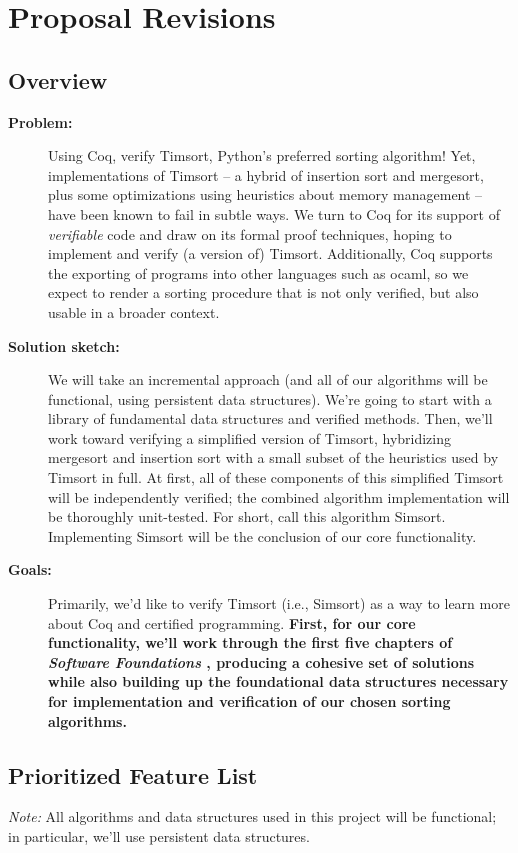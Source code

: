 \documentclass{article}
\begin{document}
\section{Proposal Revisions}
\subsection{Overview}
\begin{description}
  \item[\textbf{Problem:}]
    Using Coq, verify Timsort, Python's preferred sorting algorithm!
Yet, implementations of Timsort --
a hybrid of insertion sort and
mergesort, plus some optimizations using heuristics about memory management --
have been known
to fail in subtle ways.
We turn to Coq for its support of \emph{verifiable} code and draw on
its formal proof techniques, hoping to implement and verify (a version of)
Timsort.
Additionally, Coq supports the
exporting of programs into other languages such as ocaml, so we expect to
render a sorting procedure that is not only verified, but also
usable in a broader context.

  \item[\textbf{Solution sketch:}]
    We will take an incremental approach (and all of our algorithms
    will be functional, using persistent data structures).
    We're going to start with a
    library of fundamental data structures and verified methods.
    Then, we'll work toward verifying a
    simplified version of Timsort,
    hybridizing mergesort and insertion sort
    with a small subset of the heuristics used by Timsort in full.
    At first, all of these components of this simplified Timsort will
    be independently verified; the combined algorithm implementation
    will be thoroughly unit-tested.
    For short, call this algorithm Simsort.
    Implementing Simsort will be the conclusion of our core functionality.

  \item[\textbf{Goals:}]
    Primarily, we'd like to verify Timsort (i.e., Simsort) as a way to
    learn more about Coq and certified programming.
    \textbf{First, for our core functionality, we'll work through the first five
    chapters of \emph{Software Foundations} \cite{sf},
    producing a cohesive set of
    solutions while also building up the foundational data structures
    necessary for implementation and verification of our chosen
    sorting algorithms.}
\end{description}


\subsection{Prioritized Feature List}
\emph{Note:} All algorithms and data structures used in this project will
be functional; in particular, we'll use persistent data structures.
\end{document}
